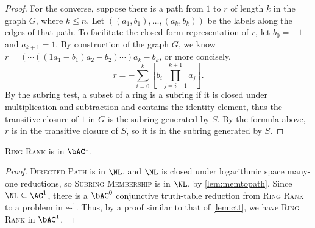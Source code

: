 \begin{proof}
  For the converse, suppose there is a path from $1$ to $r$ of length $k$ in the graph $G$, where $k \leq n$.
  Let $((a_1, b_1), \dotsc, (a_k, b_k))$ be the labels along the edges of that path.
  To facilitate the closed-form representation of $r$, let $b_0 = -1$ and $a_{k + 1} = 1$.
  By construction of the graph $G$, we know $r = (\dotsb ((1 a_1 - b_1) a_2 - b_2) \dotsb) a_k - b_k$, or more concisely,
  $$
    r = -\sum_{i = 0}^k \left[b_i \prod_{j = i + 1}^{k + 1} a_j\right].
  $$
  By the subring test, a subset of a ring is a subring if it is closed under multiplication and subtraction and contains the identity element, thus the transitive closure of $1$ in $G$ is the subring generated by $S$.
  By the formula above, $r$ is in the transitive closure of $S$, so it is in the subring generated by $S$.
\end{proof}

\begin{theorem}\label{thm:ringrank}
  \textsc{Ring Rank} is in $\bAC^1$.
\end{theorem}
\begin{proof}
  \textsc{Directed Path} is in $\NL$, and $\NL$ is closed under logarithmic space many-one reductions, so \textsc{Subring Membership} is in $\NL$, by \autoref{lem:memtopath}.
  Since $\NL \subseteq \AC^1$, there is a $\bAC^0$ conjunctive truth-table reduction from \textsc{Ring Rank} to a problem in $\AC^1$.
  Thus, by a proof similar to that of \autoref{lem:ctt}, we have \textsc{Ring Rank} in $\bAC^1$.
\end{proof}


